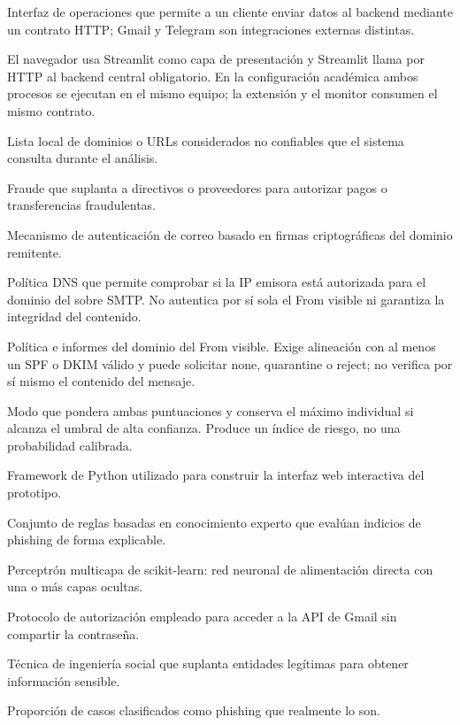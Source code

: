 \documentclass[11pt,a4paper,oneside]{report}
\begin{document}
\begin{description}[style=nextline,leftmargin=3.3cm]
  \item[API] Interfaz de operaciones que permite a un cliente enviar datos al backend mediante un contrato HTTP; Gmail y Telegram son integraciones externas distintas.
  \item[Aplicación web cliente-servidor] El navegador usa Streamlit como capa de presentación y Streamlit llama por HTTP al backend central obligatorio. En la configuración académica ambos procesos se ejecutan en el mismo equipo; la extensión y el monitor consumen el mismo contrato.
  \item[Blacklist (lista negra)] Lista local de dominios o URLs considerados no confiables que el sistema consulta durante el análisis.
  \item[Business Email Compromise (BEC)] Fraude que suplanta a directivos o proveedores para autorizar pagos o transferencias fraudulentas.
  \item[DKIM] Mecanismo de autenticación de correo basado en firmas criptográficas del dominio remitente.
  \item[SPF] Política DNS que permite comprobar si la IP emisora está autorizada para el dominio del sobre SMTP. No autentica por sí sola el From visible ni garantiza la integridad del contenido.
  \item[DMARC] Política e informes del dominio del From visible. Exige alineación con al menos un SPF o DKIM válido y puede solicitar none, quarantine o reject; no verifica por sí mismo el contenido del mensaje.
  \item[Análisis combinado] Modo que pondera ambas puntuaciones y conserva el máximo individual si alcanza el umbral de alta confianza. Produce un índice de riesgo, no una probabilidad calibrada.
  \item[Streamlit] Framework de Python utilizado para construir la interfaz web interactiva del prototipo.
  \item[Heurística] Conjunto de reglas basadas en conocimiento experto que evalúan indicios de phishing de forma explicable.
  \item[MLPClassifier] Perceptrón multicapa de scikit-learn: red neuronal de alimentación directa con una o más capas ocultas.
  \item[OAuth] Protocolo de autorización empleado para acceder a la API de Gmail sin compartir la contraseña.
  \item[Phishing] Técnica de ingeniería social que suplanta entidades legítimas para obtener información sensible.
  \item[Precisión] Proporción de casos clasificados como phishing que realmente lo son.

\end{description}
\end{document}
